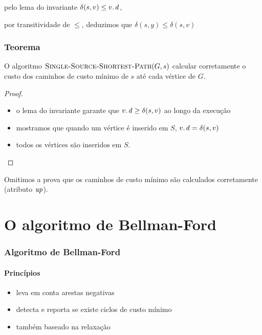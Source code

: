 \documentclass{beamer}
\begin{document}
\begin{frame}
\begin{itemize}
{\item pelo lema do invariante $\delta(s, v) \le \attrib{v}{d}$, 
\item por transitividade de $\le$, deduzimos que $\delta(s, y) \le \delta(s, v)$
}
\end{itemize}
\end{frame}

\begin{frame}
\frametitle{Teorema}

\begin{theorem}
O algoritmo $\textnormal{\scshape Single-Source-Shortest-Path}(G, s)$ calcular corretamente o 
custo dos caminhos de custo mínimo de $s$ até cada vértice de $G$.
\end{theorem}
\pause
\begin{proof}
\begin{itemize}
\item o lema do invariante garante que $\attrib{v}{d} \ge \delta(s, v)$ ao longo da execução
\item mostramos que quando um vértice é inserido em $S$, $\attrib{v}{d} = \delta(s, v)$
\item todos os vértices são inseridos em $S$.
\end{itemize}
\end{proof}
\pause
Omitimos a prova que os caminhos de custo mínimo são calculados corretamente (atributo $\id{up}$).
\end{frame}

\section{O algoritmo de Bellman-Ford}
\begin{frame}
\frametitle{Algoritmo de Bellman-Ford}
\framesubtitle{Princípios}

\begin{itemize}
\item leva em conta arestas negativas
\item detecta e reporta se existe ciclos de custo mínimo
\item também baseado na relaxação
\end{itemize}

\end{frame}
\end{document}
